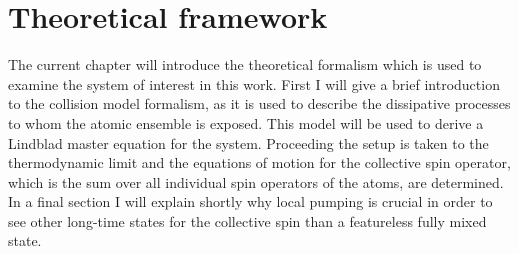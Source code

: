 

\chapter{Theoretical framework}\label{ch:theory}
The current chapter will introduce the theoretical formalism which is used to examine the system of interest in this work. First I will give a brief introduction to the collision model formalism, as it is used to describe the dissipative processes to whom the atomic ensemble is exposed. This model will be used to derive a Lindblad master equation for the system. Proceeding the setup is taken to the thermodynamic limit and the equations of motion for the collective spin operator, which is the sum over all individual spin operators of the atoms, are determined. In a final section I will explain shortly why local pumping is crucial in order to see other long-time states for the collective spin than a featureless fully mixed state.

